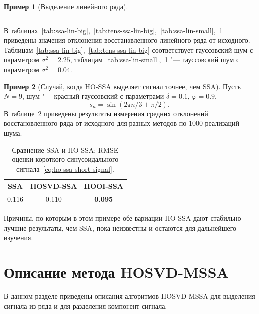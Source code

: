 \documentclass[specialist,
    substylefile = spbu_report.rtx,
    subf,href,colorlinks=true, 12pt]{disser}
\theoremstyle{plain}
\theoremstyle{definition}
\newtheorem{example}{Пример}[section]
\theoremstyle{remark}
\begin{document}
\begin{example}[Выделение линейного ряда]
\begin{table}[!ht]
\begin{tabular}{r|r|rrrrr}
                \hline
            \end{tabular}\label{tab:tens-ssa-lin-small}
        \end{table}
        В таблицах~\ref{tab:ssa-lin-big},~\ref{tab:tens-ssa-lin-big},~\ref{tab:ssa-lin-small},~\ref{tab:tens-ssa-lin-small}
        приведены значения отклонения восстановленного линейного ряда от исходного.
        Таблицам~\ref{tab:ssa-lin-big},~\ref{tab:tens-ssa-lin-big} соответствует гауссовский шум с параметром $\sigma^2=2.25$,
        таблицам~\ref{tab:ssa-lin-small},~\ref{tab:tens-ssa-lin-small} "--- гауссовский шум с параметром $\sigma^2=0.04$.
    \end{example}
    
    \FloatBarrier

    \begin{example}[Случай, когда HO-SSA выделяет сигнал точнее, чем SSA]
        Пусть $N = 9$, шум "--- красный гауссовский с параметрами $\delta = 0.1$, $\varphi = 0.9$.
        \begin{equation}
            \label{eq:ho-ssa-short-signal}
            s_n = \sin(2\pi n/3 + \pi /2).
        \end{equation}
        В таблице~\ref{tab:tssa-better-ssa} приведены результаты измерения средних отклонений восстановленного ряда от исходного
        для разных методов по 1000 реализаций шума.

        \begin{table}[!ht]
            \centering
            \caption{Сравнение SSA и HO-SSA: RMSE оценки короткого синусоидального
            сигнала~\eqref{eq:ho-ssa-short-signal}.}
            \begin{tabular}{ccc}
                \hline
                SSA   & HOSVD-SSA & HOOI-SSA       \\
                \hline
                0.116 & 0.110     & \textbf{0.095} \\
                \hline
            \end{tabular}\label{tab:tssa-better-ssa}
        \end{table}

        Причины, по которым в этом примере обе вариации HO-SSA дают стабильно лучшие результаты, чем SSA, пока неизвестны
        и остаются для дальнейшего изучения.
    \end{example}


    \section{Описание метода HOSVD-MSSA}\label{sec:Tensor-MSSA-method-description}
    В данном разделе приведены описания алгоритмов HOSVD-MSSA для выделения сигнала из ряда и для разделения компонент сигнала.
\end{document}
